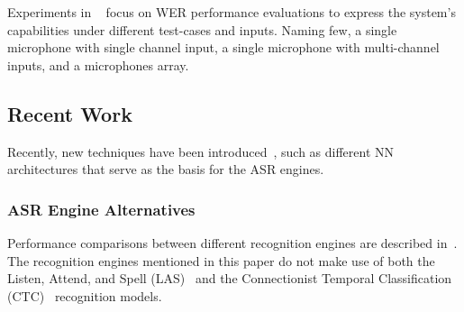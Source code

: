 
\bigskip

Experiments in ~\cite{7472778, 7952160}
focus on WER performance evaluations to express
the system's capabilities under 
different test-cases and inputs.
Naming few, a single microphone 
with single channel input,
a single microphone with multi-channel inputs,
and a microphones array.

\bigskip

\subsection{Recent Work}
Recently, new techniques have been introduced~\cite{900384911,20202222222,9003849,7471664,8466865},
such as
different NN architectures that serve as the basis for
the ASR engines.  

\subsubsection{ASR Engine Alternatives}
Performance comparisons between different recognition
engines are described in~\cite{900384911}. 
The recognition engines mentioned in this paper
do not make use of both the 
Listen, Attend, and Spell (LAS)~\cite{7472621}
and the 
Connectionist Temporal 
Classification (CTC)~\cite{hannun2017sequence}
recognition models.

\bigskip

